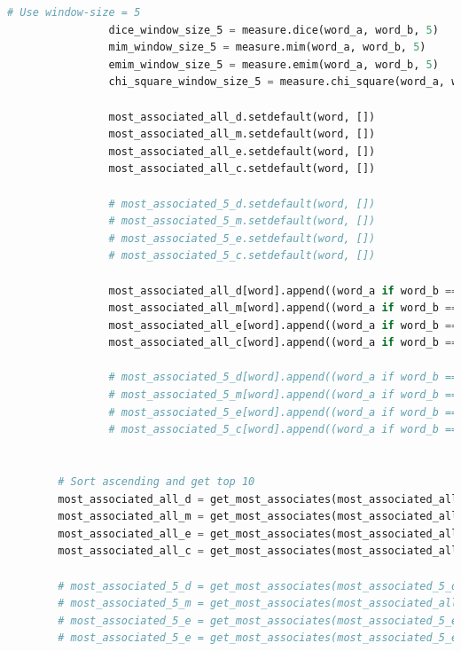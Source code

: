\documentclass[letterpaper,11pt]{article}
\begin{document}
\begin{lstlisting}[language=python, caption={Association Measure}, label={lst:assoc_measure}]
                # Use window-size = 5
                dice_window_size_5 = measure.dice(word_a, word_b, 5)
                mim_window_size_5 = measure.mim(word_a, word_b, 5)
                emim_window_size_5 = measure.emim(word_a, word_b, 5)
                chi_square_window_size_5 = measure.chi_square(word_a, word_b, 5)

                most_associated_all_d.setdefault(word, [])
                most_associated_all_m.setdefault(word, [])
                most_associated_all_e.setdefault(word, [])
                most_associated_all_c.setdefault(word, [])

                # most_associated_5_d.setdefault(word, [])
                # most_associated_5_m.setdefault(word, [])
                # most_associated_5_e.setdefault(word, [])
                # most_associated_5_c.setdefault(word, [])

                most_associated_all_d[word].append((word_a if word_b == word else word_b, dice_window_size_all))
                most_associated_all_m[word].append((word_a if word_b == word else word_b, mim_window_size_all))
                most_associated_all_e[word].append((word_a if word_b == word else word_b, emim_window_size_all))
                most_associated_all_c[word].append((word_a if word_b == word else word_b, chi_square_window_size_all))

                # most_associated_5_d[word].append((word_a if word_b == word else word_b, dice_window_size_5))
                # most_associated_5_m[word].append((word_a if word_b == word else word_b, mim_window_size_5))
                # most_associated_5_e[word].append((word_a if word_b == word else word_b, emim_window_size_5))
                # most_associated_5_c[word].append((word_a if word_b == word else word_b, chi_square_window_size_5))


        # Sort ascending and get top 10
        most_associated_all_d = get_most_associates(most_associated_all_d)
        most_associated_all_m = get_most_associates(most_associated_all_m)
        most_associated_all_e = get_most_associates(most_associated_all_e)
        most_associated_all_c = get_most_associates(most_associated_all_c)

        # most_associated_5_d = get_most_associates(most_associated_5_d)
        # most_associated_5_m = get_most_associates(most_associated_all_d)
        # most_associated_5_e = get_most_associates(most_associated_5_e)
        # most_associated_5_e = get_most_associates(most_associated_5_e)


\end{lstlisting}
\end{document}
